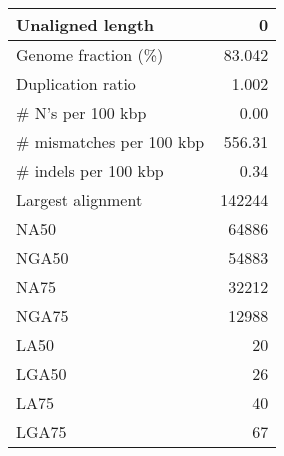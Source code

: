 \documentclass[12pt,a4paper]{article}
\begin{document}
\begin{table}[ht]
\begin{center}
\begin{tabular}{|l*{1}{|r}|}
Unaligned length & 0 \\ \hline
Genome fraction (\%) & 83.042 \\ \hline
Duplication ratio & 1.002 \\ \hline
\# N's per 100 kbp & 0.00 \\ \hline
\# mismatches per 100 kbp & 556.31 \\ \hline
\# indels per 100 kbp & 0.34 \\ \hline
Largest alignment & 142244 \\ \hline
NA50 & 64886 \\ \hline
NGA50 & 54883 \\ \hline
NA75 & 32212 \\ \hline
NGA75 & 12988 \\ \hline
LA50 & 20 \\ \hline
LGA50 & 26 \\ \hline
LA75 & 40 \\ \hline
LGA75 & 67 \\ \hline
\end{tabular}
\end{center}
\end{table}
\end{document}
